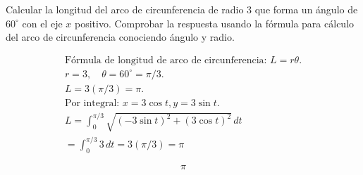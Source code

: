 Calcular la longitud del arco de circunferencia de radio $3$ que forma un ángulo de $60^\circ$ con el eje $x$ positivo. Comprobar la respuesta usando la fórmula para cálculo del arco de circunferencia conociendo ángulo y radio.

\nopagebreak
\begin{align*}
\text{Fórmula de longitud de arco de circunferencia: } L = r \theta. \\
r = 3, \quad \theta = 60^\circ = \pi/3. \\
L = 3 (\pi/3) = \pi. \\
\text{Por integral: } x=3\cos t, y=3\sin t. \\
L = \int_{0}^{\pi/3} \sqrt{(-3\sin t)^2 + (3\cos t)^2} \, dt \\
= \int_{0}^{\pi/3} 3 \, dt = 3(\pi/3) = \pi
\end{align*}

\[
\boxed{\displaystyle \pi}
\]
